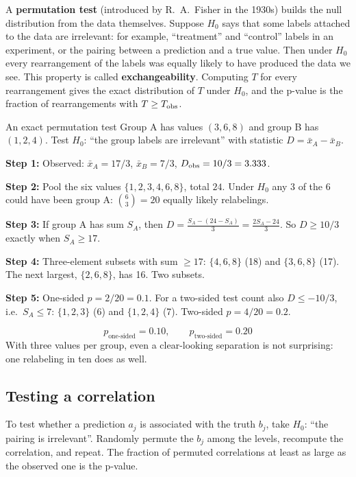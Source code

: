 A \textbf{permutation test} (introduced by R.~A.~Fisher in the 1930s) builds the null distribution from the data themselves. Suppose $H_0$ says that some labels attached to the data are irrelevant: for example, ``treatment'' and ``control'' labels in an experiment, or the pairing between a prediction and a true value. Then under $H_0$ every rearrangement of the labels was equally likely to have produced the data we see. This property is called \textbf{exchangeability}. Computing $T$ for every rearrangement gives the exact distribution of $T$ under $H_0$, and the p-value is the fraction of rearrangements with $T\ge T_{\rm obs}$.

\begin{sample}{An exact permutation test}
Group A has values $(3,6,8)$ and group B has $(1,2,4)$. Test $H_0$: ``the group labels are irrelevant'' with statistic $D=\bar x_A-\bar x_B$.

\textbf{Step 1:} Observed: $\bar x_A=17/3$, $\bar x_B=7/3$, $D_{\rm obs}=10/3=3.333$.

\textbf{Step 2:} Pool the six values $\{1,2,3,4,6,8\}$, total $24$. Under $H_0$ any 3 of the 6 could have been group A: $\binom63=20$ equally likely relabelings.

\textbf{Step 3:} If group A has sum $S_A$, then $D=\frac{S_A-(24-S_A)}{3}=\frac{2S_A-24}{3}$. So $D\ge10/3$ exactly when $S_A\ge17$.

\textbf{Step 4:} Three-element subsets with sum $\ge17$: $\{4,6,8\}$ (18) and $\{3,6,8\}$ (17). The next largest, $\{2,6,8\}$, has 16. Two subsets.

\textbf{Step 5:} One-sided $p=2/20=0.1$. For a two-sided test count also $D\le-10/3$, i.e.\ $S_A\le7$: $\{1,2,3\}$ (6) and $\{1,2,4\}$ (7). Two-sided $p=4/20=0.2$.

\[
\boxed{p_{\text{one-sided}}=0.10,\qquad p_{\text{two-sided}}=0.20}
\]
With three values per group, even a clear-looking separation is not surprising: one relabeling in ten does as well.
\end{sample}

\subsection{Testing a correlation}

To test whether a prediction $a_j$ is associated with the truth $b_j$, take $H_0$: ``the pairing is irrelevant''. Randomly permute the $b_j$ among the levels, recompute the correlation, and repeat. The fraction of permuted correlations at least as large as the observed one is the p-value.

